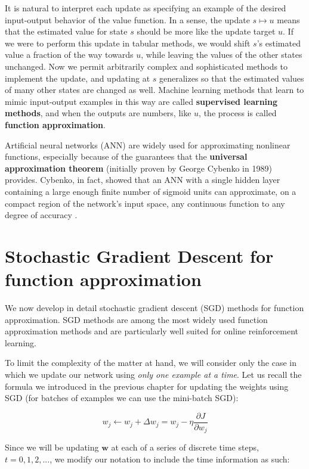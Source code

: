 It is natural to interpret each update as specifying an example of the desired input-output behavior of the value function. In a sense, the update $s \mapsto u$ means that the estimated value for state $s$ should be more like the update target $u$. If we were to perform this update in tabular methods, we would shift $s$’s estimated value a fraction of the way towards $u$, while leaving the values of the other states unchanged. Now we permit arbitrarily complex and sophisticated methods to implement the update, and updating at $s$ generalizes so that the estimated values of many other states are changed as well. Machine learning methods that learn to mimic input-output examples in this way are called \textbf{supervised learning methods}, and when the outputs are numbers, like $u$, the process is called \textbf{function approximation}.

Artificial neural networks (ANN) are widely used for approximating nonlinear functions, especially because of the guarantees that the \textbf{universal approximation theorem} (initially proven by George Cybenko in 1989) provides. Cybenko, in fact, showed that an ANN with a single hidden layer containing a large enough finite number of sigmoid units can approximate, on a compact region of the network’s input space, any continuous function to any degree of accuracy \cite{Cybenko1989ApproximationBS}.

\section{Stochastic Gradient Descent for function approximation}
We now develop in detail stochastic gradient descent (SGD) methods for function approximation. SGD methods are among the most widely used function approximation methods and are particularly well suited for online reinforcement learning.

To limit the complexity of the matter at hand, we will consider only the case in which we update our network using \textit{only one example at a time}. Let us recall the formula we introduced in the previous chapter for updating the weights using SGD (for batches of examples we can use the mini-batch SGD):

\begin{equation}
    w_j \leftarrow w_j + \Delta w_j = w_j - \eta \frac{\partial J}{\partial w_j}
    \label{eq:ch7-singlesgdupdate}
\end{equation}

Since we will be updating $\boldsymbol{w}$ at each of a series of discrete time steps, $t = 0, 1, 2, ...$, we modify our notation to include the time information as such:

